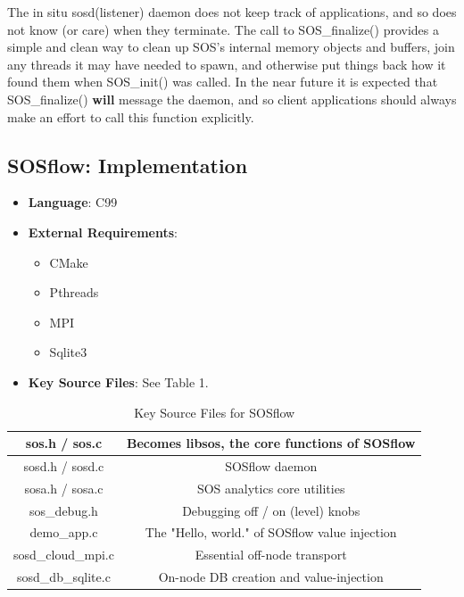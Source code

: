 The in situ sosd(listener) daemon does not keep track of applications,
and so does not know (or care) when they terminate. The call to SOS\_finalize()
provides a simple and clean way to clean up SOS's internal memory objects
and buffers, join any threads it may have needed to spawn, and otherwise
put things back how it found them when SOS\_init() was called. In the
near future it is expected that SOS\_finalize() \textbf{will} message the
daemon, and so client applications should always make an effort to call
this function explicitly.

\subsection{SOSflow: Implementation}
\begin{itemize}
  \item \textbf{Language}: C99
   \item \textbf{External Requirements}:
   \begin{itemize}
    \item CMake
    \item Pthreads
    \item MPI
    \item Sqlite3
    \end{itemize}
  \item \textbf{Key Source Files}: See Table 1.
\end{itemize}

\begin{table}[!t]
\renewcommand{\arraystretch}{1.3}
\caption{Key Source Files for SOSflow}
\label{tableexample}
\centering
\begin{tabular}{|c|c|}
\hline %
sos.h / sos.c & Becomes libsos, the core functions of SOSflow\\
\hline %
sosd.h / sosd.c & SOSflow daemon\\
\hline %
sosa.h / sosa.c & SOS analytics core utilities\\
\hline %
sos\_debug.h & Debugging off / on (level) knobs\\
\hline %
demo\_app.c & The "Hello, world." of SOSflow value injection\\
\hline %
sosd\_cloud\_mpi.c & Essential off-node transport\\
\hline %
sosd\_db\_sqlite.c & On-node DB creation and value-injection\\
\hline %
\end{tabular}
\end{table}



